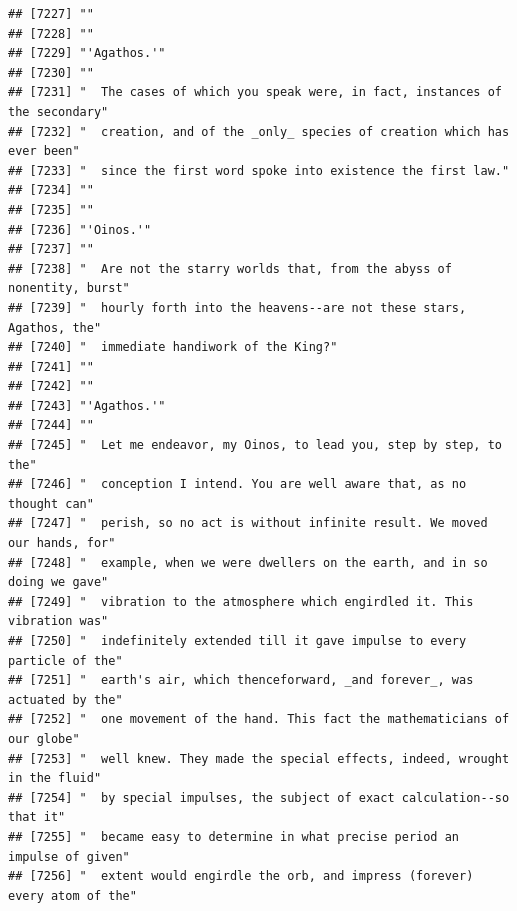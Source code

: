 \documentclass{article}\usepackage[]{graphicx}\usepackage[]{color}
\makeatletter
\newenvironment{kframe}{%
 \def\at@end@of@kframe{}%
 \ifinner\ifhmode%
  \def\at@end@of@kframe{\end{minipage}}%
  \begin{minipage}{\columnwidth}%
 \fi\fi%
 \def\FrameCommand##1{\hskip\@totalleftmargin \hskip-\fboxsep
 \colorbox{shadecolor}{##1}\hskip-\fboxsep
     \hskip-\linewidth \hskip-\@totalleftmargin \hskip\columnwidth}%
 \MakeFramed {\advance\hsize-\width
   \@totalleftmargin\z@ \linewidth\hsize
   \@setminipage}}%
 {\par\unskip\endMakeFramed%
 \at@end@of@kframe}
\newenvironment{knitrout}{}{} %
\makeatother
\begin{document}
\begin{knitrout}
\begin{kframe}
\begin{verbatim}
## [7227] ""                                                                            
## [7228] ""                                                                            
## [7229] "'Agathos.'"                                                                  
## [7230] ""                                                                            
## [7231] "  The cases of which you speak were, in fact, instances of the secondary"    
## [7232] "  creation, and of the _only_ species of creation which has ever been"       
## [7233] "  since the first word spoke into existence the first law."                  
## [7234] ""                                                                            
## [7235] ""                                                                            
## [7236] "'Oinos.'"                                                                    
## [7237] ""                                                                            
## [7238] "  Are not the starry worlds that, from the abyss of nonentity, burst"        
## [7239] "  hourly forth into the heavens--are not these stars, Agathos, the"          
## [7240] "  immediate handiwork of the King?"                                          
## [7241] ""                                                                            
## [7242] ""                                                                            
## [7243] "'Agathos.'"                                                                  
## [7244] ""                                                                            
## [7245] "  Let me endeavor, my Oinos, to lead you, step by step, to the"              
## [7246] "  conception I intend. You are well aware that, as no thought can"           
## [7247] "  perish, so no act is without infinite result. We moved our hands, for"     
## [7248] "  example, when we were dwellers on the earth, and in so doing we gave"      
## [7249] "  vibration to the atmosphere which engirdled it. This vibration was"        
## [7250] "  indefinitely extended till it gave impulse to every particle of the"       
## [7251] "  earth's air, which thenceforward, _and forever_, was actuated by the"      
## [7252] "  one movement of the hand. This fact the mathematicians of our globe"       
## [7253] "  well knew. They made the special effects, indeed, wrought in the fluid"    
## [7254] "  by special impulses, the subject of exact calculation--so that it"         
## [7255] "  became easy to determine in what precise period an impulse of given"       
## [7256] "  extent would engirdle the orb, and impress (forever) every atom of the"    

\end{verbatim}
\end{kframe}
\end{knitrout}
\end{document}
